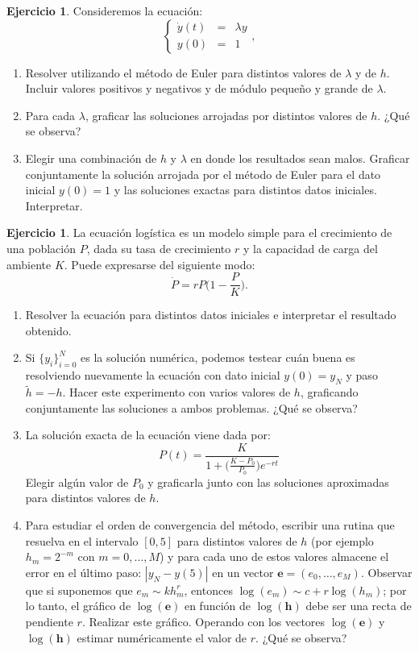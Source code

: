 \documentclass[12pt, a4paper]{amsbook}
\newcommand{\ee}{{\mathbf e}}
\newcommand{\hh}{{\mathbf h}}
\theoremstyle{remark}
\theoremstyle{definition}
\newtheorem{ejer}[teo]{Ejercicio}
\numberwithin{section}{chapter}
\numberwithin{subsection}{section}
\numberwithin{equation}{section}
\numberwithin{figure}{chapter}
\begin{document}
\begin{ejer}\label{lambda}
Consideremos la ecuación:
$$\left\{\begin{array}{rcl}\dot{y}(t) &=& \lambda y \\
                    y(0)  &=& 1\end{array}\right.,$$
\begin{enumerate}
\item Resolver utilizando el método de Euler para distintos valores de $\lambda$ y de $h$. Incluir valores positivos y negativos y de módulo pequeño y grande de $\lambda$. 
\item Para cada $\lambda$, graficar las soluciones arrojadas por distintos valores de $h$. ¿Qué se observa?
\item Elegir una combinación de $h$ y $\lambda$ en donde los resultados sean malos. Graficar conjuntamente la solución arrojada por el método de Euler para el dato inicial $y(0)=1$ y las soluciones exactas para distintos datos iniciales. Interpretar.
\end{enumerate}
\end{ejer}


\begin{ejer} La ecuación logística es un  modelo simple para el crecimiento de una población $P$, dada su tasa de crecimiento $r$  y la capacidad de carga del ambiente $K$. Puede expresarse del siguiente modo:
\[\dot{P} = rP\Big(1-\frac{P}{K}\Big).\]
\begin{enumerate}
\item Resolver la ecuación para distintos datos iniciales e interpretar el resultado obtenido. 
\item Si $\{y_i\}_{i=0}^N$ es la solución numérica, podemos testear cuán buena es resolviendo nuevamente la ecuación con dato inicial $y(0)=y_N$ y paso $\tilde{h}=-h$. Hacer este experimento con varios valores de $h$, graficando conjuntamente las soluciones a ambos problemas. ¿Qué se observa?
\item La solución exacta de la ecuación viene dada por: 
      \[P(t) = \frac{K}{1+\big(\frac{K-P_0}{P_0}\big)e^{-rt}}\]
      Elegir algún valor de $P_0$ y graficarla junto con las soluciones aproximadas para distintos valores de $h$. 
\item Para estudiar el orden de convergencia del método, escribir una rutina que resuelva en el intervalo $[0,5]$ para distintos valores de $h$ (por ejemplo $h_m=2^{-m}$ con $m=0,\dots,M$) y para cada uno de estos valores almacene el error en el último paso: $|y_N-y(5)|$ en un vector $\ee=(e_0,\dots,e_M)$. Observar que si suponemos que $e_m\sim k h_m^r$, entonces $\log(e_m) \sim c + r \log(h_m)$; por lo tanto, el gráfico de $\log(\ee)$ en función de $\log(\hh)$ debe ser una recta de pendiente $r$. Realizar este gráfico. Operando con los vectores $\log(\ee)$ y $\log(\hh)$  estimar numéricamente  el valor de $r$. ¿Qué se observa?
\end{enumerate}
\end{ejer}
\end{document}
